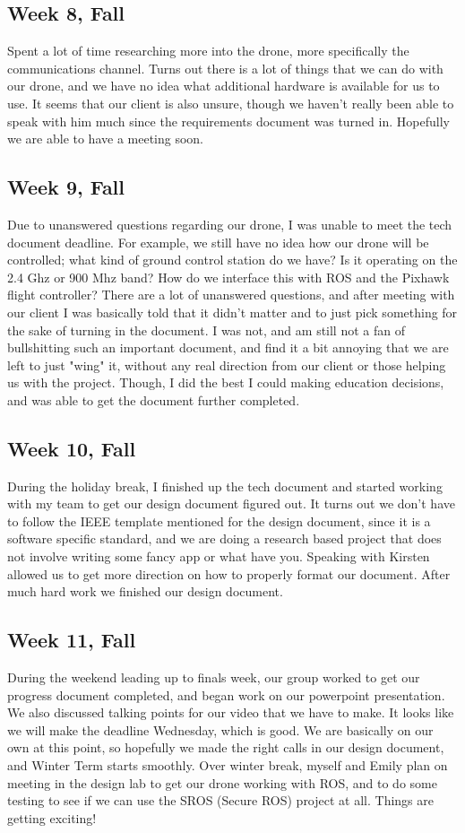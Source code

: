 \subsection{Week 8, Fall}
Spent a lot of time researching more into the drone, more specifically the communications channel. Turns out there is a lot of things that we can do with our drone, and we have no idea what additional hardware is available for us to use. It seems that our client is also unsure, though we haven't really been able to speak with him much since the requirements document was turned in. Hopefully we are able to have a meeting soon.
\subsection{Week 9, Fall}
Due to unanswered questions regarding our drone, I was unable to meet the tech document deadline. For example, we still have no idea how our drone will be controlled; what kind of ground control station do we have? Is it operating on the 2.4 Ghz or 900 Mhz band? How do we interface this with ROS and the Pixhawk flight controller? There are a lot of unanswered questions, and after meeting with our client I was basically told that it didn't matter and to just pick something for the sake of turning in the document. I was not, and am still not a fan of bullshitting such an important document, and find it a bit annoying that we are left to just "wing" it, without any real direction from our client or those helping us with the project. Though, I did the best I could making education decisions, and was able to get the document further completed.
\subsection{Week 10, Fall}
During the holiday break, I finished up the tech document and started working with my team to get our design document figured out. It turns out we don't have to follow the IEEE template mentioned for the design document, since it is a software specific standard, and we are doing a research based project that does not involve writing some fancy app or what have you. Speaking with Kirsten allowed us to get more direction on how to properly format our document. After much hard work we finished our design document.
\subsection{Week 11, Fall}
During the weekend leading up to finals week, our group worked to get our progress document completed, and began work on our powerpoint presentation. We also discussed talking points for our video that we have to make. It looks like we will make the deadline Wednesday, which is good. We are basically on our own at this point, so hopefully we made the right calls in our design document, and Winter Term starts smoothly. Over winter break, myself and Emily plan on meeting in the design lab to get our drone working with ROS, and to do some testing to see if we can use the SROS (Secure ROS) project at all. Things are getting exciting!
